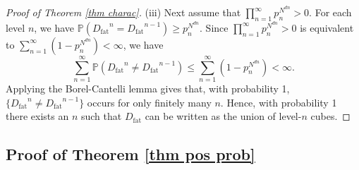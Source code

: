 \documentclass[11pt,a4paper]{article}
\newcommand{\IP}{\ensuremath{\mathbb{P}}}
\newcommand{\Dfat}{\ensuremath{D_{\text{fat}}}}
\theoremstyle{remark}
\begin{document}
\begin{proof}[Proof of Theorem \ref{thm charac}]
(iii) Next assume that $\prod_{n=1}^{\infty} p_n^{N^{dn}} > 0$. For each level $n$, we have $\IP(\Dfat^n=\Dfat^{n-1}) \geq p_n^{N^{dn}}$. Since $\prod_{n=1}^{\infty} p_n^{N^{dn}} > 0$ is equivalent to $\sum_{n=1}^{\infty}( 1 - p_n^{N^{dn}}) < \infty$, we have
\[
\sum_{n=1}^{\infty} \IP(\Dfat^n\neq \Dfat^{n-1}) \leq \sum_{n=1}^{\infty} (1 - p_n^{N^{dn}}) < \infty.
\]
Applying the Borel-Cantelli lemma gives that, with probability 1, $\{\Dfat^n \neq \Dfat^{n-1}\}$ occurs 
for only finitely many $n$. Hence, with probability 1 there exists an $n$ such that $\Dfat$ can be written as the union of level-$n$ cubes.
\end{proof}



\subsection{Proof of Theorem \ref{thm pos prob}}
\end{document}
